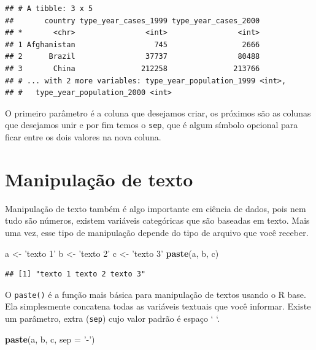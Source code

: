 \documentclass[]{book}
\newenvironment{Shaded}{\begin{snugshade}}{\end{snugshade}}
\newcommand{\KeywordTok}[1]{\textcolor[rgb]{0.13,0.29,0.53}{\textbf{#1}}}
\newcommand{\DataTypeTok}[1]{\textcolor[rgb]{0.13,0.29,0.53}{#1}}
\newcommand{\StringTok}[1]{\textcolor[rgb]{0.31,0.60,0.02}{#1}}
\newcommand{\NormalTok}[1]{#1}
\begin{document}
\begin{verbatim}
## # A tibble: 3 x 5
##       country type_year_cases_1999 type_year_cases_2000
## *       <chr>                <int>                <int>
## 1 Afghanistan                  745                 2666
## 2      Brazil                37737                80488
## 3       China               212258               213766
## # ... with 2 more variables: type_year_population_1999 <int>,
## #   type_year_population_2000 <int>
\end{verbatim}

O primeiro parâmetro é a coluna que desejamos criar, os próximos são as
colunas que desejamos unir e por fim temos o \texttt{sep}, que é algum
símbolo opcional para ficar entre os dois valores na nova coluna.

\section{Manipulação de texto}\label{manipulacao-de-texto}

Manipulação de texto também é algo importante em ciência de dados, pois
nem tudo são números, existem variáveis categóricas que são baseadas em
texto. Mais uma vez, esse tipo de manipulação depende do tipo de arquivo
que você receber.

\begin{Shaded}
\begin{Highlighting}[]
\NormalTok{a <-}\StringTok{ 'texto 1'}
\NormalTok{b <-}\StringTok{ 'texto 2'}
\NormalTok{c <-}\StringTok{ 'texto 3'}
\KeywordTok{paste}\NormalTok{(a, b, c)}
\end{Highlighting}
\end{Shaded}

\begin{verbatim}
## [1] "texto 1 texto 2 texto 3"
\end{verbatim}

O \texttt{paste()} é a função mais básica para manipulação de textos
usando o R base. Ela simplesmente concatena todas as variáveis textuais
que você informar. Existe um parâmetro, extra (\texttt{sep}) cujo valor
padrão é espaço ` `.

\begin{Shaded}
\begin{Highlighting}[]
\KeywordTok{paste}\NormalTok{(a, b, c, }\DataTypeTok{sep =} \StringTok{'-'}\NormalTok{)}
\end{Highlighting}
\end{Shaded}
\end{document}
